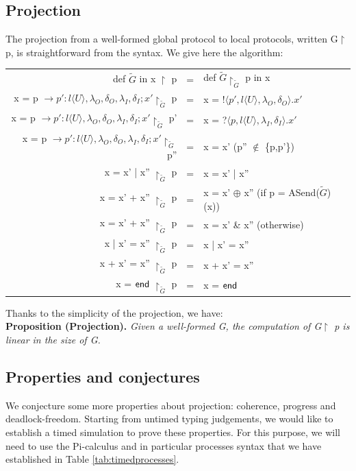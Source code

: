 \documentclass[a4paper,11pt,twoside]{report}
\newcommand{\kf}[1]{\textup{\textsf{#1}}\xspace}
\newcommand{\G}{\ensuremath{G}}
\newcommand{\UT}{\ensuremath{U}}
\newcommand{\End}{\kf{end}}
\begin{document}
\subsection{Projection}
The projection from a well-formed global protocol to local protocols, written G$\upharpoonright$ p, is straightforward from the syntax. We give here the algorithm:
\begin{center}
\begin{tabular}{rcl}
def $\tilde{\G}$ in x $\upharpoonright$ p & = & def $\tilde{\G}\upharpoonright_{\tilde{\G}}$ p in x \\
x  = p $\rightarrow p' : l \langle \UT \rangle, \lambda_{O}, \delta_{O}, \lambda_{I}, \delta_{I} ;x' \upharpoonright_{\tilde{\G}}$ p & = &  x  = !$\langle p',  l \langle \UT \rangle, \lambda_{O}, \delta_{O} \rangle.x' $ \\
x  = p $\rightarrow p' : l \langle \UT \rangle, \lambda_{O}, \delta_{O}, \lambda_{I}, \delta_{I} ;x' \upharpoonright_{\tilde{\G}}$ p' & = &  x  = ?$\langle p,  l \langle \UT \rangle, \lambda_{I}, \delta_{I} \rangle.x' $ \\
x  = p $\rightarrow p' : l \langle \UT \rangle, \lambda_{O}, \delta_{O}, \lambda_{I}, \delta_{I} ;x' \upharpoonright_{\tilde{\G}}$ p'' & = &  x = x' (p'' $\notin$ \{p,p'\})\\
x = x' | x'' $\upharpoonright_{\tilde{\G}}$ p & = &  x = x' | x''\\
x = x' + x'' $\upharpoonright_{\tilde{\G}}$ p & = & x = x' $\oplus$ x'' (if p = ASend($\tilde{\G}$)(x))\\
x = x' + x'' $\upharpoonright_{\tilde{\G}}$ p & = & x = x' \& x'' (otherwise)\\
x | x' = x'' $\upharpoonright_{\tilde{\G}}$ p & = &  x | x' = x'' \\
x + x' = x'' $\upharpoonright_{\tilde{\G}}$ p & = & x + x' = x'' \\
x = $\End$ $\upharpoonright_{\tilde{\G}}$ p & = & x = $\End$ \\
\end{tabular}
\end{center}

Thanks to the simplicity of the projection, we have:\\
\textbf{Proposition (Projection).} \textit{Given a well-formed G, the computation of G$\upharpoonright$ p is linear in the size of G.}


\subsection{Properties and conjectures}
We conjecture some more properties about projection: coherence, progress and deadlock-freedom. Starting from untimed typing judgements, we would like to establish a timed simulation to prove these properties. For this purpose, we will need to use the Pi-calculus and in particular processes syntax that we have established in Table \ref{tab:timedprocesses}.
\end{document}
